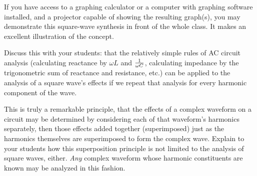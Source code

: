 
If you have access to a graphing calculator or a computer with graphing software installed, and a projector capable of showing the resulting graph(s), you may demonstrate this square-wave synthesis in front of the whole class.  It makes an excellent illustration of the concept.

Discuss this with your students: that the relatively simple rules of AC circuit analysis (calculating reactance by $\omega L$ and $1 \over {\omega C}$, calculating impedance by the trigonometric sum of reactance and resistance, etc.) can be applied to the analysis of a square wave's effects if we repeat that analysis for every harmonic component of the wave.  

This is truly a remarkable principle, that the effects of a complex waveform on a circuit may be determined by considering each of that waveform's harmonics separately, then those effects added together (superimposed) just as the harmonics themselves are superimposed to form the complex wave.  Explain to your students how this superposition principle is not limited to the analysis of square waves, either.  {\it Any} complex waveform whose harmonic constituents are known may be analyzed in this fashion.




